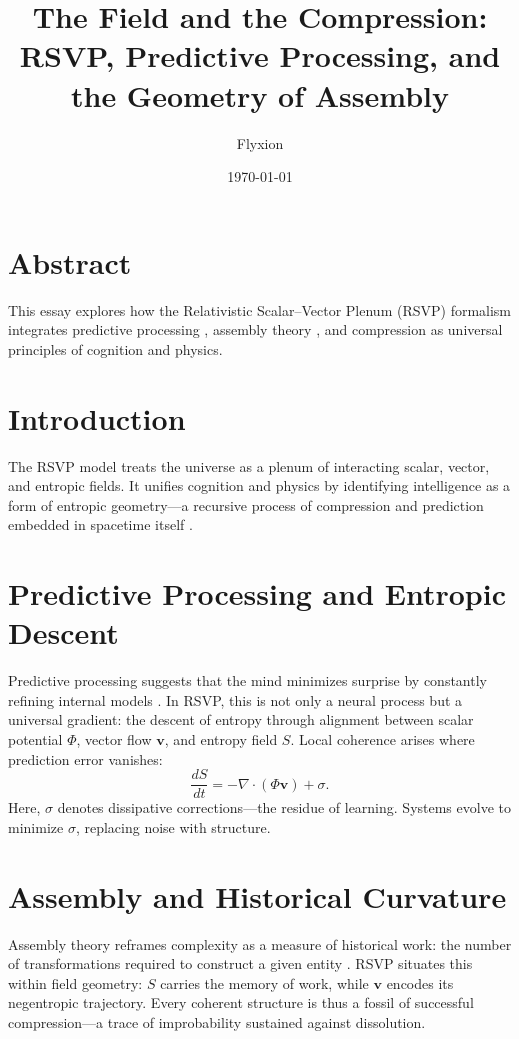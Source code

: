 \documentclass[12pt]{article}
\title{The Field and the Compression:\\RSVP, Predictive Processing, and the Geometry of Assembly}
\author{Flyxion}
\date{\today}
\begin{document}
\maketitle

\section*{Abstract}
This essay explores how the Relativistic Scalar--Vector Plenum (RSVP) formalism integrates predictive processing \cite{friston2023active}, assembly theory \cite{marshall2021assembly}, and compression as universal principles of cognition and physics.

\section{Introduction}
The RSVP model treats the universe as a plenum of interacting scalar, vector, and entropic fields. It unifies cognition and physics by identifying intelligence as a form of entropic geometry---a recursive process of compression and prediction embedded in spacetime itself \cite{barandes2025unistochastic}.

\section{Predictive Processing and Entropic Descent}
Predictive processing suggests that the mind minimizes surprise by constantly refining internal models \cite{friston2023active}. In RSVP, this is not only a neural process but a universal gradient: the descent of entropy through alignment between scalar potential $\Phi$, vector flow $\mathbf{v}$, and entropy field $S$. Local coherence arises where prediction error vanishes:
\[
\frac{dS}{dt} = -\nabla \cdot (\Phi \mathbf{v}) + \sigma.
\]
Here, $\sigma$ denotes dissipative corrections---the residue of learning. Systems evolve to minimize $\sigma$, replacing noise with structure.

\section{Assembly and Historical Curvature}
Assembly theory reframes complexity as a measure of historical work: the number of transformations required to construct a given entity \cite{marshall2021assembly}. RSVP situates this within field geometry: $S$ carries the memory of work, while $\mathbf{v}$ encodes its negentropic trajectory. Every coherent structure is thus a fossil of successful compression---a trace of improbability sustained against dissolution.
\end{document}
